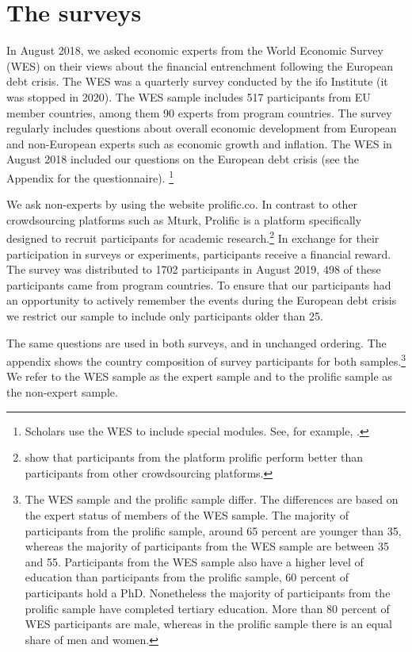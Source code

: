 \section{The surveys }
In August 2018, we asked economic experts from the World
Economic Survey (WES) on their views about the financial
entrenchment following the European debt crisis. The WES was a quarterly
survey conducted by the ifo Institute (it was stopped in 2020). The WES sample includes 517
participants from EU member countries, among them 90 experts from program countries.
The survey regularly includes questions about overall economic development
from European and non-European experts such as economic growth and
inflation. The WES in August 2018 included our
questions on the European debt crisis (see the Appendix for the
questionnaire). \footnote{Scholars use the WES to include special modules. See, for example, \cite{mosler}.}

We ask non-experts by using the website
prolific.co. In contrast to other crowdsourcing platforms such as Mturk,
Prolific is a platform specifically designed to recruit participants for
academic research.\footnote{\cite{Peer} show that participants from
the platform prolific perform better than participants from other
crowdsourcing platforms.} In exchange for their participation in surveys or
experiments, participants receive a financial reward. The survey was
distributed to 1702 participants in August 2019, 498 of these participants
came from program countries. To ensure that our participants had an
opportunity to actively remember the events during the European debt crisis
we restrict our sample to include only participants older than 25.

The same questions are used in both surveys, and in
unchanged ordering. The appendix shows the country composition of survey
participants for both samples.\footnote{%
The WES sample and the prolific sample differ. The differences are based on the expert status of members
of the WES sample. The majority of participants from the prolific sample,
around 65 percent are younger than 35, whereas the majority of participants
from the WES sample are between 35 and 55. Participants from the WES sample
also have a higher level of education than participants from the
prolific sample, 60 percent of participants hold a PhD. Nonetheless the
majority of participants from the prolific sample have completed tertiary
education. More than 80 percent of WES participants are male, whereas in the
prolific sample there is an equal share of men and women.} We refer to the
WES sample as the expert sample and to the prolific sample as the non-expert
sample. 